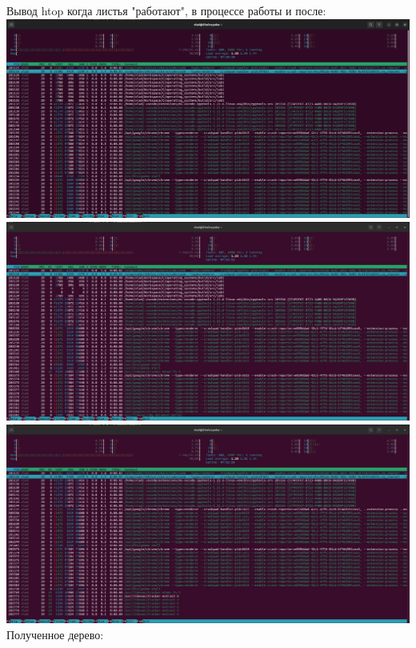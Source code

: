 \documentclass[a4paper,14pt]{extarticle}
\begin{document}
Вывод htop когда листья "работают", в процессе работы и после:\\
\includegraphics[width=140mm]{main_htop_before}\\
\includegraphics[width=140mm]{main_htop_mid}\\
\includegraphics[width=140mm]{main_htop_after}\\
Полученное дерево:\\
\end{document}
